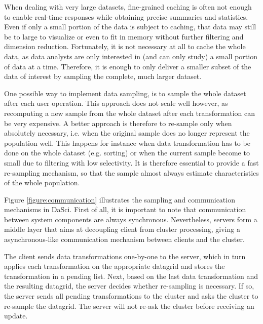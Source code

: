 \documentclass[10pt, a4paper, twocolumn]{article} %
\begin{document}
When dealing with very large datasets, fine-grained caching is often not enough to enable real-time responses while obtaining precise summaries and statistics.
Even if only a small portion of the data is subject to caching, that data may still be to large to visualize or even to fit in memory without further filtering and dimension reduction.
Fortunately, it is not necessary at all to cache the whole data, as data analysts are only interested in (and can only study) a small portion of data at a time.
Therefore, it is enough to only deliver a smaller subset of the data of interest by sampling the complete, much larger dataset.

One possible way to implement data sampling, is to sample the whole dataset after each user operation. This approach does not scale well however, as recomputing a new sample from the whole dataset after each transformation can be very expensive. 
A better approach is therefore to re-sample only when absolutely necessary, i.e. when the original sample does no longer represent the population well.
This happens for instance when data transformation has to be done on the whole dataset (e.g. sorting) or when the current sample become to small due to filtering with low selectivity.
It is therefore essential to provide a fast re-sampling mechanism, so that the sample almost always estimate characteristics of the whole population.

Figure \ref{figure:communication} illustrates the sampling and communication mechanisms in DaSci.
First of all, it is important to note that communication between system components are always synchronous. Nevertheless, servers form a middle layer that aims at decoupling client from cluster processing, giving a asynchronous-like communication mechanism between clients and the cluster.

The client sends data transformations one-by-one to the server, which in turn applies each transformation on the appropriate datagrid and stores the transformation in a pending list.
Next, based on the last data transformation and the resulting datagrid, the server decides whether re-sampling is necessary. If so, the server sends all pending transformations to the cluster and asks the cluster to re-sample the datagrid. The server will not re-ask the cluster before receiving an update.
\end{document}
